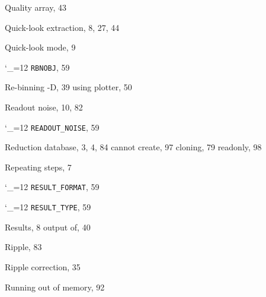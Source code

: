 \documentclass[11pt,twoside]{article}
\newcommand{\cmdname}{\begingroup \catcode`\_=12 \realcmdname}
\newcommand{\realcmdname}[1]{\endgroup\texttt{#1}}
\begin{document}
\begin{theindex}
  \indexspace

  \item Quality array, 43
  \item Quick-look extraction, 8, 27, 44
  \item Quick-look mode, 9

  \indexspace

  \item \cmdname {RBNOBJ}, 59
  \item Re-binning
    -D, 39
    \subitem using plotter, 50
  \item Readout noise, 10, 82
  \item \cmdname {READOUT_NOISE}, 59
  \item Reduction database, 3, 4, 84
    \subitem cannot create, 97
    \subitem cloning, 79
    \subitem readonly, 98
  \item Repeating steps, 7
  \item \cmdname {RESULT_FORMAT}, 59
  \item \cmdname {RESULT_TYPE}, 59
  \item Results, 8
    \subitem output of, 40
  \item Ripple, 83
  \item Ripple correction, 35
  \item Running out of memory, 92

  \indexspace


\end{theindex}
\end{document}
